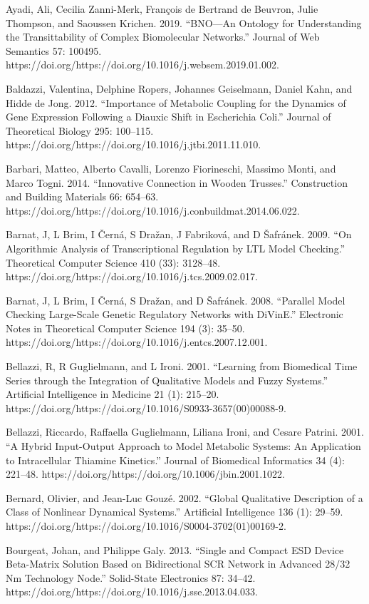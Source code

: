 \documentclass[utf8]{gradu3}
\begin{document}
Ayadi, Ali, Cecilia Zanni-Merk, François de Bertrand de Beuvron, Julie Thompson, and Saoussen Krichen. 2019. “BNO—An Ontology for Understanding the Transittability of Complex Biomolecular Networks.” Journal of Web Semantics 57: 100495. https://doi.org/https://doi.org/10.1016/j.websem.2019.01.002.

Baldazzi, Valentina, Delphine Ropers, Johannes Geiselmann, Daniel Kahn, and Hidde de Jong. 2012. “Importance of Metabolic Coupling for the Dynamics of Gene Expression Following a Diauxic Shift in Escherichia Coli.” Journal of Theoretical Biology 295: 100–115. https://doi.org/https://doi.org/10.1016/j.jtbi.2011.11.010.

Barbari, Matteo, Alberto Cavalli, Lorenzo Fiorineschi, Massimo Monti, and Marco Togni. 2014. “Innovative Connection in Wooden Trusses.” Construction and Building Materials 66: 654–63. https://doi.org/https://doi.org/10.1016/j.conbuildmat.2014.06.022.

Barnat, J, L Brim, I Černá, S Dražan, J Fabriková, and D Šafránek. 2009. “On Algorithmic Analysis of Transcriptional Regulation by LTL Model Checking.” Theoretical Computer Science 410 (33): 3128–48. https://doi.org/https://doi.org/10.1016/j.tcs.2009.02.017.

Barnat, J, L Brim, I Černá, S Dražan, and D Šafránek. 2008. “Parallel Model Checking Large-Scale Genetic Regulatory Networks with DiVinE.” Electronic Notes in Theoretical Computer Science 194 (3): 35–50. https://doi.org/https://doi.org/10.1016/j.entcs.2007.12.001.

Bellazzi, R, R Guglielmann, and L Ironi. 2001. “Learning from Biomedical Time Series through the Integration of Qualitative Models and Fuzzy Systems.” Artificial Intelligence in Medicine 21 (1): 215–20. https://doi.org/https://doi.org/10.1016/S0933-3657(00)00088-9.

Bellazzi, Riccardo, Raffaella Guglielmann, Liliana Ironi, and Cesare Patrini. 2001. “A Hybrid Input-Output Approach to Model Metabolic Systems: An Application to Intracellular Thiamine Kinetics.” Journal of Biomedical Informatics 34 (4): 221–48. https://doi.org/https://doi.org/10.1006/jbin.2001.1022.

Bernard, Olivier, and Jean-Luc Gouzé. 2002. “Global Qualitative Description of a Class of Nonlinear Dynamical Systems.” Artificial Intelligence 136 (1): 29–59. https://doi.org/https://doi.org/10.1016/S0004-3702(01)00169-2.

Bourgeat, Johan, and Philippe Galy. 2013. “Single and Compact ESD Device Beta-Matrix Solution Based on Bidirectional SCR Network in Advanced 28/32 Nm Technology Node.” Solid-State Electronics 87: 34–42. https://doi.org/https://doi.org/10.1016/j.sse.2013.04.033.
\end{document}
